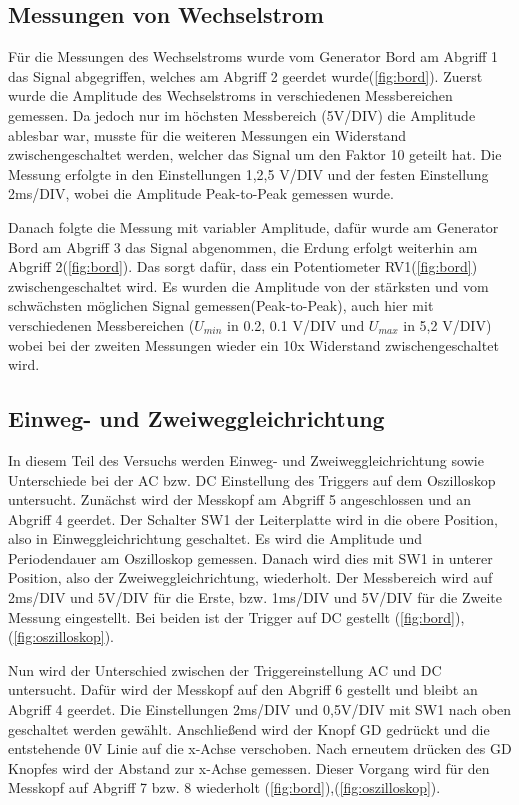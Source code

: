 \subsection{Messungen von Wechselstrom}
Für die Messungen des Wechselstroms wurde vom Generator Bord am Abgriff 1 das Signal abgegriffen, welches am Abgriff 2 geerdet wurde(\ref{fig:bord}). 
Zuerst wurde die Amplitude des Wechselstroms in verschiedenen Messbereichen gemessen. Da jedoch nur im höchsten Messbereich (5V/DIV) die Amplitude ablesbar war, musste für die weiteren Messungen ein Widerstand zwischengeschaltet werden, welcher das Signal um den Faktor 10 geteilt hat. Die Messung erfolgte in den Einstellungen 1,2,5 V/DIV und der festen Einstellung 2ms/DIV, wobei die Amplitude Peak-to-Peak gemessen wurde.

\noindent
Danach folgte die Messung mit variabler Amplitude, dafür wurde am Generator Bord am Abgriff 3 das Signal abgenommen, die Erdung erfolgt weiterhin am Abgriff 2(\ref{fig:bord}). Das sorgt dafür, dass ein Potentiometer RV1(\ref{fig:bord})
zwischengeschaltet wird.
Es wurden die Amplitude von der stärksten und vom schwächsten möglichen Signal gemessen(Peak-to-Peak), auch hier mit verschiedenen Messbereichen ($U_{min}$ in 0.2, 0.1 V/DIV und $U_{max}$ in 5,2 V/DIV) wobei bei der zweiten Messungen wieder ein 10x Widerstand zwischengeschaltet wird. 

\subsection{Einweg- und Zweiweggleichrichtung}
In diesem Teil des Versuchs werden Einweg- und Zweiweggleichrichtung sowie Unterschiede bei der AC bzw. DC Einstellung des Triggers auf dem Oszilloskop untersucht. Zunächst wird der Messkopf am Abgriff 5 angeschlossen und an Abgriff 4 geerdet. Der Schalter SW1 der Leiterplatte wird in die obere Position, also in Einweggleichrichtung geschaltet. Es wird die Amplitude und Periodendauer am Oszilloskop gemessen. Danach wird dies mit SW1 in unterer Position, also der Zweiweggleichrichtung, wiederholt. Der Messbereich wird auf 2ms/DIV und 5V/DIV für die Erste, bzw. 1ms/DIV und 5V/DIV für die Zweite Messung eingestellt. Bei beiden ist der Trigger auf DC gestellt
(\ref{fig:bord}),(\ref{fig:oszilloskop}).

\noindent
Nun wird der Unterschied zwischen der Triggereinstellung AC und DC untersucht. Dafür wird der Messkopf auf den Abgriff 6 gestellt und bleibt an Abgriff 4 geerdet. Die Einstellungen 2ms/DIV und 0,5V/DIV mit SW1 nach oben geschaltet werden gewählt. Anschließend wird der Knopf GD gedrückt und die entstehende 0V Linie auf die x-Achse verschoben. Nach erneutem drücken des GD Knopfes wird der Abstand zur x-Achse gemessen. Dieser Vorgang wird für den Messkopf auf Abgriff 7 bzw. 8 wiederholt
(\ref{fig:bord}),(\ref{fig:oszilloskop}).

